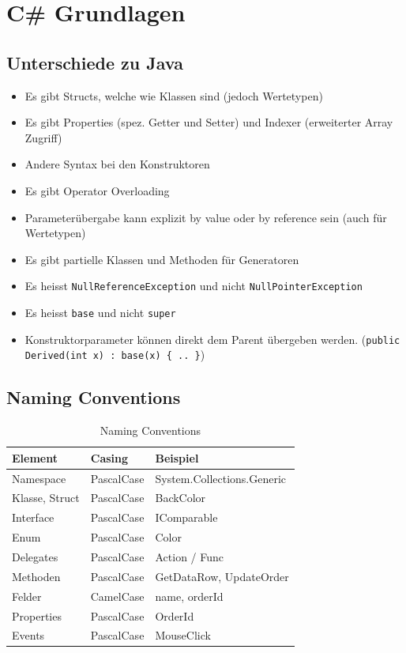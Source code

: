 \documentclass[
a4paper,
oneside,
10pt,
fleqn,
headsepline,
toc=listofnumbered, 
bibliography=totocnumbered]{scrartcl}
\let\stdsection\section
\renewcommand\section{\clearpage\stdsection}
\begin{document}
\section{C\# Grundlagen}
\subsection{Unterschiede zu Java}
\begin{itemize}
	\item Es gibt Structs, welche wie Klassen sind (jedoch Wertetypen)
	\item Es gibt Properties (spez. Getter und Setter) und Indexer (erweiterter Array Zugriff)
	\item Andere Syntax bei den Konstruktoren
	\item Es gibt Operator Overloading
	\item Parameterübergabe kann explizit by value oder by reference sein (auch für Wertetypen)
	\item Es gibt partielle Klassen und Methoden für Generatoren
	\item Es heisst \lstinline|NullReferenceException| und nicht \lstinline|NullPointerException|
	\item Es heisst \lstinline|base| und nicht \lstinline|super|
	\item Konstruktorparameter können direkt dem Parent übergeben werden. (\lstinline|public Derived(int x) : base(x) { .. }|)
\end{itemize}

\subsection{Naming Conventions}
\begin{table}[ht]
	\centering
	\begin{tabu} to \linewidth {l l l}
		\toprule
		Element        & Casing     & Beispiel                   \\
		\midrule
		Namespace      & PascalCase & System.Collections.Generic \\
		Klasse, Struct & PascalCase & BackColor                  \\
		Interface      & PascalCase & IComparable                \\
		Enum           & PascalCase & Color                      \\
		Delegates      & PascalCase & Action / Func              \\
		Methoden       & PascalCase & GetDataRow, UpdateOrder    \\
		Felder         & CamelCase  & name, orderId              \\
		Properties     & PascalCase & OrderId                    \\
		Events         & PascalCase & MouseClick                 \\
		\bottomrule
	\end{tabu}
	\caption{Naming Conventions}
\end{table}
\end{document}

